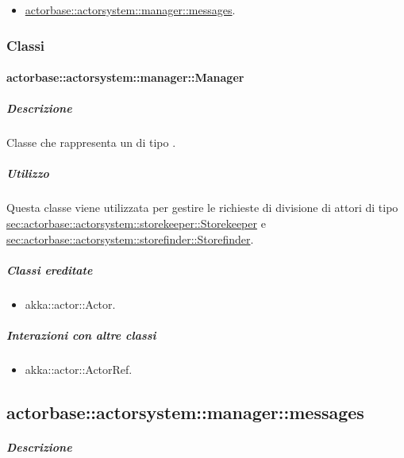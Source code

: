 \documentclass{scalatekids-article}
\begin{document}
\begin{itemize}

\item \hyperref[sec:actorbase::actorsystem::manager::messages]{actorbase::actorsystem::manager::messages}.

\end{itemize}

\subsubsection{Classi}

\paragraph{actorbase::actorsystem::manager::Manager}
\label{sec:actorbase::actorsystem::manager::Manager}

\subparagraph{Descrizione}

Classe che rappresenta un  di tipo .

\subparagraph{Utilizzo}

Questa classe viene utilizzata per gestire le richieste di divisione di attori di tipo
\hyperref[sec:actorbase::actorsystem::storekeeper::Storekeeper]{sec:actorbase::\allowbreak{}actorsystem::\allowbreak{}storekeeper::\allowbreak{}Storekeeper}
e \hyperref[sec:actorbase::actorsystem::storefinder::Storefinder]{sec:actorbase::\allowbreak{}actorsystem::\allowbreak{}storefinder::\allowbreak{}Storefinder}.

\subparagraph{Classi ereditate}

\begin{itemize}

\item akka::actor::Actor.

\end{itemize}

\subparagraph{Interazioni con altre classi}

\begin{itemize}
\item akka::actor::ActorRef.
\end{itemize}

\subsection{actorbase::actorsystem::manager::messages}
\label{sec:actorbase::actorsystem::manager::messages}

\subparagraph{Descrizione}
\end{document}
